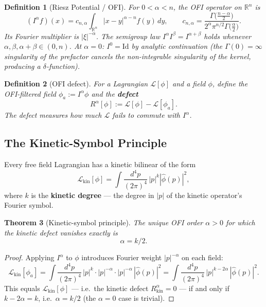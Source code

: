 \documentclass[12pt]{article}
\newtheorem{theorem}{Theorem}[section]
\newtheorem{definition}[theorem]{Definition}
\theoremstyle{definition}
\newcommand{\R}{\mathbb{R}}
\newcommand{\abs}[1]{\left|#1\right|}
\begin{document}
\begin{definition}[Riesz Potential / OFI]
For $0 < \alpha < n$, the OFI operator on $\R^n$ is
\begin{equation}
  (I^\alpha f)(x) = c_{n,\alpha} \int_{\R^n} \abs{x-y}^{\alpha-n} f(y)\,dy,
  \qquad
  c_{n,\alpha} = \frac{\Gamma\!\bigl(\tfrac{n-\alpha}{2}\bigr)}
                      {2^\alpha \pi^{n/2} \Gamma\!\bigl(\tfrac{\alpha}{2}\bigr)}.
\end{equation}
Its Fourier multiplier is $\abs{\xi}^{-\alpha}$.  The semigroup law
$I^\alpha I^\beta = I^{\alpha+\beta}$ holds whenever $\alpha,\beta,\alpha+\beta \in (0,n)$.
At $\alpha=0$: $I^0 = \mathrm{Id}$ by analytic continuation (the $\Gamma(0)=\infty$
singularity of the prefactor cancels the non-integrable singularity of the kernel,
producing a $\delta$-function).
\end{definition}

\begin{definition}[OFI defect]
For a Lagrangian $\mathcal{L}[\phi]$ and a field $\phi$, define the
OFI-filtered field $\phi_a := I^\alpha \phi$ and the \textbf{defect}
\begin{equation}
  R^\alpha[\phi] := \mathcal{L}[\phi] - \mathcal{L}[\phi_a].
\end{equation}
The defect measures how much $\mathcal{L}$ fails to commute with $I^\alpha$.
\end{definition}

\subsection{The Kinetic-Symbol Principle}

Every free field Lagrangian has a kinetic bilinear of the form
\begin{equation}
  \mathcal{L}_{\mathrm{kin}}[\phi]
  = \int \frac{d^4p}{(2\pi)^4}\, \abs{p}^k \abs{\hat\phi(p)}^2,
\end{equation}
where $k$ is the \textbf{kinetic degree} — the degree in $\abs{p}$ of the
kinetic operator's Fourier symbol.

\begin{theorem}[Kinetic-symbol principle]
\label{thm:ksp}
The unique OFI order $\alpha > 0$ for which the kinetic defect vanishes
exactly is
\begin{equation}
  \boxed{\alpha = k/2.}
  \label{eq:ksp}
\end{equation}
\end{theorem}

\begin{proof}
Applying $I^\alpha$ to $\phi$ introduces Fourier weight $\abs{p}^{-\alpha}$
on each field:
\[
  \mathcal{L}_{\mathrm{kin}}[\phi_a]
  = \int \frac{d^4p}{(2\pi)^4}\, \abs{p}^k \cdot
    \abs{p}^{-\alpha} \cdot \abs{p}^{-\alpha}\,
    \abs{\hat\phi(p)}^2
  = \int \frac{d^4p}{(2\pi)^4}\, \abs{p}^{k-2\alpha}\,\abs{\hat\phi(p)}^2.
\]
This equals $\mathcal{L}_{\mathrm{kin}}[\phi]$ — i.e.\ the kinetic defect
$R^\alpha_{\mathrm{kin}} = 0$ — if and only if $k - 2\alpha = k$, i.e.\
$\alpha = k/2$ (the $\alpha=0$ case is trivial).
\end{proof}
\end{document}
